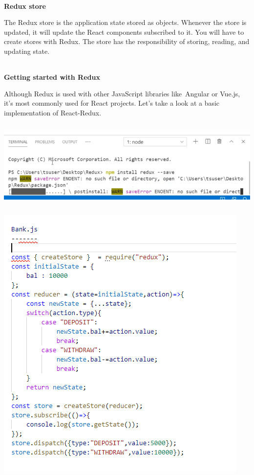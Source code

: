 \documentclass{article}
\begin{document}
\noindent 
\\
\textbf{Redux store}

\noindent The Redux store is the application state stored as objects. Whenever the store is updated, it will update the React components subscribed to it. You will have to create stores with Redux. The store has the responsibility of storing, reading, and updating state.

\noindent 
\\
\textbf{Getting started with Redux}

\noindent Although Redux is used with other JavaScript libraries like~Angular or Vue.js, it's most commonly used for React projects. Let's take a look at a basic implementation of React-Redux.

\noindent 

\noindent 

\begin{center}
	\noindent \includegraphics*[width=6.25in, height=1.74in]{IMG-11-02}
\end{center}

\noindent 

\noindent 

\begin{center}
	\noindent \includegraphics*[width=4.96in, height=5.45in]{IMG-11-03}
\end{center}
\end{document}
